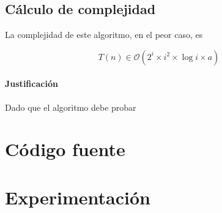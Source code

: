 \documentclass[10pt, a4paper]{article}
\begin{document}
	\subsection{C\'alculo de complejidad}
	La complejidad de este algoritmo, en el peor caso, es

	\begin{equation*}	
	T(n) \in \mathcal{O}(2^{i} \times i^{2} \times \log{i} \times a )
	\end{equation*}
	
	\paragraph{Justificaci\'on}
	Dado que el algoritmo debe probar 

\section{C\'odigo fuente}

\section{Experimentaci\'on}
\end{document}
